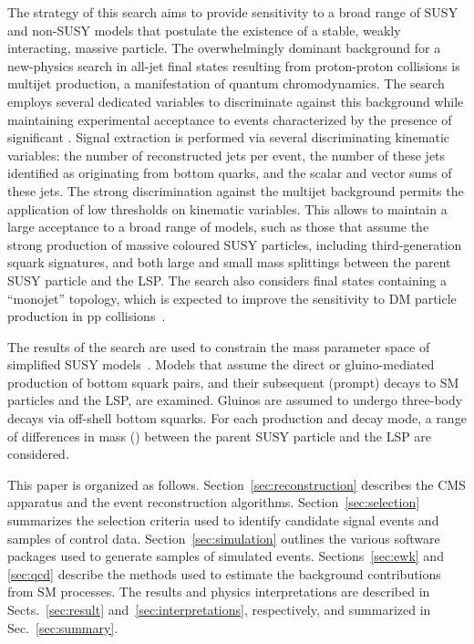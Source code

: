 The strategy of this search aims to provide sensitivity to a broad
range of SUSY and non-SUSY models that postulate the existence of a
stable, weakly interacting, massive particle. The overwhelmingly
dominant background for a new-physics search in all-jet final states
resulting from proton-proton collisions is multijet production, a
manifestation of quantum chromodynamics. The search employs several
dedicated variables to discriminate against this background while
maintaining experimental acceptance to events characterized by the
presence of significant \ptvecmiss. Signal extraction is performed via
several discriminating kinematic variables: the number of
reconstructed jets per event, the number of these jets identified as
originating from bottom quarks, and the scalar and vector \pt sums of
these jets. The strong discrimination against the multijet background
permits the application of low thresholds on kinematic variables. This
allows to maintain a large acceptance to a broad range of models, such
as those that assume the strong production of massive coloured SUSY
particles, including third-generation squark signatures, and both
large and small mass splittings between the parent SUSY particle and
the LSP. The search also considers final states containing a
``monojet'' topology, which is expected to improve the sensitivity to
DM particle production in pp collisions~\cite{Fox:2012ee,
  Buchmueller:2015eea}.

The results of the search are used to constrain the mass parameter
space of simplified SUSY models~\cite{Alwall:2008ag, Alwall:2008va,
  sms}. Models that assume the direct or gluino-mediated production of
bottom squark pairs, and their subsequent (prompt) decays to SM
particles and the LSP, are examined. Gluinos are assumed to undergo
three-body decays via off-shell bottom squarks. For each production
and decay mode, a range of differences in mass (\dm) between the
parent SUSY particle and the LSP are considered. 

This paper is organized as follows. Section~\ref{sec:reconstruction}
describes the CMS apparatus and the event reconstruction
algorithms. Section~\ref{sec:selection} summarizes the selection
criteria used to identify candidate signal events and samples of
control data. Section~\ref{sec:simulation} outlines the various
software packages used to generate samples of simulated
events. Sections~\ref{sec:ewk} and \ref{sec:qcd} describe the methods
used to estimate the background contributions from SM processes. The
results and physics interpretations are described in
Sects.~\ref{sec:result} and~\ref{sec:interpretations}, respectively,
and summarized in Sec.~\ref{sec:summary}.

